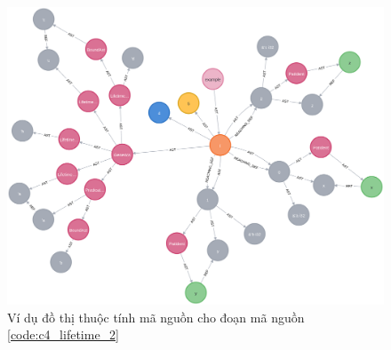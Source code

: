 \begin{figure}[H]
    \includegraphics[width=1\columnwidth]{figures/c4/c4_lifetime_2.png}
    \centering
    \caption{Ví dụ đồ thị thuộc tính mã nguồn cho đoạn mã nguồn \ref{code:c4_lifetime_2}}
    \label{img:c4_lifetime_2}
\end{figure}


